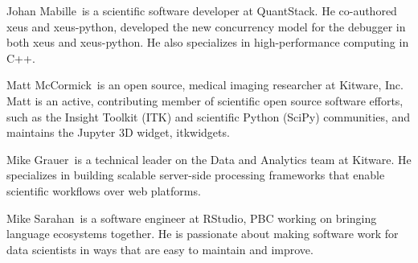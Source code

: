 \documentclass{IEEEcsmag}
\begin{document}
\begin{IEEEbiography}{Johan Mabille}{\,} is a scientific software developer at QuantStack. He co-authored xeus and xeus-python, developed the new concurrency model for the debugger in both xeus and xeus-python. He also specializes in high-performance computing in C++. 
\end{IEEEbiography}

\begin{IEEEbiography}{Matt McCormick}{\,} is an open source, medical imaging researcher at Kitware, Inc. Matt is an active, contributing member of scientific open source software efforts, such as the Insight Toolkit (ITK) and scientific Python (SciPy) communities, and maintains the Jupyter 3D widget, itkwidgets.
\end{IEEEbiography}

\begin{IEEEbiography}{Mike Grauer}{\,} is a technical leader on the Data and Analytics team at Kitware. He specializes in building scalable server-side processing frameworks that enable scientific workflows over web platforms.
\end{IEEEbiography}

\begin{IEEEbiography}{Mike Sarahan}{\,} is a software engineer at RStudio, PBC working on bringing language ecosystems together. He is passionate about making software work for data scientists in ways that are easy to maintain and improve.
\end{IEEEbiography}
\end{document}
